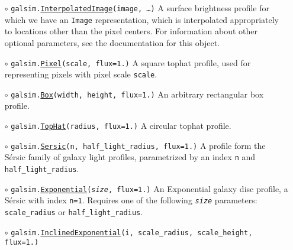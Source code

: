 \documentclass[preprint,10pt]{../../devel/modules/aastex}
\begin{document}
\begin{itemize}
\item[$\circ$]
  \texttt{galsim.}\href{http://galsim-developers.github.io/GalSim/classgalsim_1_1interpolatedimage_1_1_interpolated_image.html}{\texttt{InterpolatedImage}}\texttt{(image, \dots)}
    \newline
    A surface brightness profile for which we have an \texttt{Image} representation,
    which is interpolated appropriately to locations other than the pixel centers.
    For information about other optional parameters, see the documentation for this object.
\item[$\circ$]
  \texttt{galsim.}\href{http://galsim-developers.github.com/GalSim/classgalsim_1_1base_1_1_pixel.html}{\texttt{Pixel}}\texttt{(scale, flux=1.)}
    \newline
    A square tophat profile, used for representing pixels with pixel scale \texttt{scale}.
\item[$\circ$]
  \texttt{galsim.}\href{http://galsim-developers.github.com/GalSim/classgalsim_1_1base_1_1_box.html}{\texttt{Box}}\texttt{(width, height, flux=1.)}
    \newline
    An arbitrary rectangular box profile.
\item[$\circ$]
  \texttt{galsim.}\href{http://galsim-developers.github.io/GalSim/classgalsim_1_1base_1_1_top_hat.html}{\texttt{TopHat}}\texttt{(radius, flux=1.)}
    \newline
    A circular tophat profile.
\item[$\circ$]
  \texttt{galsim.}\href{http://galsim-developers.github.com/GalSim/classgalsim_1_1base_1_1_sersic.html}{\texttt{Sersic}}\texttt{(n, half\_light\_radius, flux=1.)}
    \newline
    A profile form the S\'{e}rsic family of galaxy light
    profiles, parametrized by an index \texttt{n} and \texttt{half\_light\_radius}.
\item[$\circ$]
  \texttt{galsim.}\href{http://galsim-developers.github.com/GalSim/classgalsim_1_1base_1_1_exponential.html}{\texttt{Exponential}}\texttt{(\emph{size}, flux=1.)}
    \newline
    An Exponential galaxy disc profile, a S\'{e}rsic
    with index \texttt{n=1}.  Requires one of the
    following \texttt{\emph{size}} parameters: \texttt{scale\_radius} or \texttt{half\_light\_radius}.
\item[$\circ$]
  \texttt{galsim.}\href{http://galsim-developers.github.com/GalSim/classgalsim_1_1base_1_1_inclined_exponential.html}{\texttt{InclinedExponential}}\texttt{(i, scale\_radius, scale\_height, flux=1.)}

\end{itemize}
\end{document}
